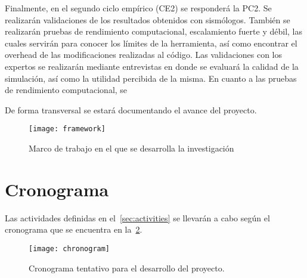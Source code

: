 Finalmente, en el segundo ciclo empírico (CE2) se responderá la PC2. Se realizarán validaciones de los resultados obtenidos con sismólogos. También se realizarán pruebas de rendimiento computacional, escalamiento fuerte y débil, las cuales servirán para conocer los límites de la herramienta, así como encontrar el overhead de las modificaciones realizadas al código. Las validaciones con los expertos se realizarán mediante entrevistas en donde se evaluará la calidad de la simulación, así como la utilidad percibida de la misma. En cuanto a las pruebas de rendimiento computacional, se 

De forma transversal se estará documentando el avance del proyecto.

\begin{figure}[h]
    \centering
    \texttt{[image: framework]}
    \caption{Marco de trabajo en el que se desarrolla la investigación}
    \label{fig:framework}
\end{figure}

\section{Cronograma}
Las actividades definidas en el~\cref{sec:activities} se llevarán a cabo según el cronograma que se encuentra en la~\cref{fig:chronogram}.

\begin{figure}
    \centering
    \texttt{[image: chronogram]}
    \caption{Cronograma tentativo para el desarrollo del proyecto.}
    \label{fig:chronogram}
\end{figure}